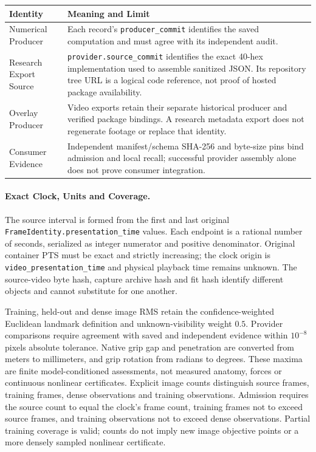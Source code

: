 \documentclass[11pt,letterpaper]{article}
\newcommand{\code}[1]{\nolinkurl{#1}}
\begin{document}
\begin{longtable}{@{}p{1.65in}p{4.65in}@{}}
\toprule Identity & Meaning and Limit\\\midrule\endhead
Numerical Producer & Each record's \code{producer\_commit} identifies the saved computation and must agree with its independent audit.\\
Research Export Source & \code{provider.source\_commit} identifies the exact 40-hex implementation used to assemble sanitized JSON. Its repository tree URL is a logical code reference, not proof of hosted package availability.\\
Overlay Producer & Video exports retain their separate historical producer and verified package bindings. A research metadata export does not regenerate footage or replace that identity.\\
Consumer Evidence & Independent manifest/schema SHA-256 and byte-size pins bind admission and local recall; successful provider assembly alone does not prove consumer integration.\\
\bottomrule
\end{longtable}

\paragraph{Exact Clock, Units and Coverage.}
The source interval is formed from the first and last original
\code{FrameIdentity.presentation\_time} values. Each endpoint is a rational
number of seconds, serialized as integer numerator and positive denominator.
Original container PTS must be exact and strictly increasing; the clock origin
is \code{video\_presentation\_time} and physical playback time remains unknown.
The source-video byte hash, capture archive hash and fit hash identify different
objects and cannot substitute for one another.

Training, held-out and dense image RMS retain the confidence-weighted Euclidean
landmark definition and unknown-visibility weight $0.5$. Provider comparisons
require agreement with saved and independent evidence within $10^{-8}$ pixels
absolute tolerance. Native grip gap and penetration are converted from meters
to millimeters, and grip rotation from radians to degrees. These maxima are
finite model-conditioned assessments, not measured anatomy, forces or
continuous nonlinear certificates. Explicit image counts distinguish source
frames, training frames, dense observations and training observations. Admission
requires the source count to equal the clock's frame count, training frames not
to exceed source frames, and training observations not to exceed dense
observations. Partial training coverage is valid; counts do not imply new image
objective points or a more densely sampled nonlinear certificate.
\end{document}

